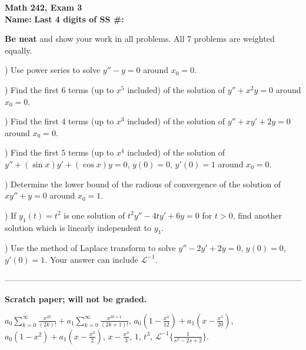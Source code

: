\documentclass[12pt]{amsart}
\begin{document}
\noindent
{\bf Math 242, Exam 3}\\
{\bf  Name:} \hskip 3in {\bf Last 4 digits of SS \#:}

\noindent
{\bf Be neat} and show your work in all problems. All 7 problems are weighted
equally.

) Use power series to solve $y''-y=0$ around $x_0= 0$.


) Find the first $6$ terms (up to $x^5$ included) of the solution of $y''+x^2y=0$ around 
$x_0=0$.



) Find the first $4$ terms (up to $x^3$ included) of the solution of $y''+xy'+2y=0$ around 
$x_0=0$.


) Find the first $5$ terms (up to $x^4$ included) of the solution of $y''+(\sin x)y'+(\cos x)y=0$,
$y(0)=0$, $y'(0)=1$  around $x_0=0$.

) Determine the lower bound of the radious of convergence of the solution of $xy''+y=0$ around
$x_0=1$.


) If $y_1(t)=t^2$ is one solution of $t^2y''-4ty'+6y=0$ for $t>0$, find another solution
which is linearly independent to $y_1$.

) Use the method of Laplace transform to solve $y''-2y'+2y=0$, $y(0)=0$, $y'(0)=1$. Your answer
can include ${\mathcal L}^{-1}$. 
\vskip 4.5in


\noindent
------------------------------------------------------------------------------------------------------------

\noindent
{\bf Scratch paper; will not be graded.}

\noindent
$a_0 \sum_{k=0}^\infty \frac{x^{2k}}{(2k)!}+ a_1 \sum_{k=0}^\infty \frac{x^{2k+1}}{(2k+1)!}$,
$a_0(1-\frac{x^4}{12})+a_1(x-\frac{x^5}{20})$,
$a_0(1-x^2)+a_1(x-\frac{x^3}{2})$,
$x-\frac{x^3}{3}$, 
$1$,
$t^3$,
${\mathcal L}^{-1}\{ \frac{1}{s^2-2s+2} \}$.
\end{document}
